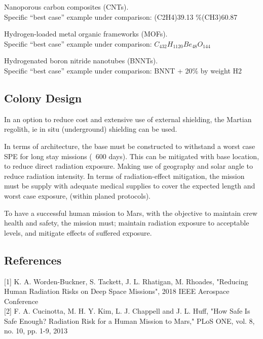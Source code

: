 \documentclass[12pt,a4paper]{article}
\begin{document}
\begin{center}
Nanoporous carbon composites (CNTs).\\ 
Specific “best case” example under comparison:
(C2H4)39.13 \%(CH3)60.87%

Hydrogen-loaded metal organic frameworks (MOFs).\\
Specific “best case” example under comparison:
$C_{432}H_{1120}Be_{48}O_{144}$

Hydrogenated boron nitride nanotubes (BNNTs).\\
Specific “best case” example under comparison: BNNT
+ 20\% by weight H2 
\end{center}
\subsection{Colony Design}
In an option to reduce cost and extensive use of external shielding, the Martian regolith, ie in situ (underground) shielding can be used. 

In terms of architecture, the base must be constructed to withstand a worst case SPE for long stay missions (~600 days). This can be mitigated with base location, to reduce direct radiation exposure. Making use of geography and solar angle to reduce radiation intensity. In terms of radiation-effect mitigation, the mission must be supply with adequate medical supplies to cover the expected length and worst case exposure, (within planed protocols).
 
To have a successful human mission to Mars, with the objective to maintain crew health and safety, the mission must; maintain radiation exposure to acceptable levels, and mitigate effects of suffered exposure.

\begin{center}

\newpage
\section*{References}
\end{center}
{[1]} K. A. Worden-Buckner, S. Tackett, J. L. Rhatigan, M. Rhoades, "Reducing Human Radiation Risks on Deep Space Missions", 2018 IEEE Aerospace Conference \\

{[2]} F. A. Cucinotta, M. H. Y. Kim, L. J. Chappell and J. L.
Huff, "How Safe Is Safe Enough? Radiation Risk for a
Human Mission to Mars," PLoS ONE, vol. 8, no. 10,
pp. 1-9, 2013 \\
\end{document}
